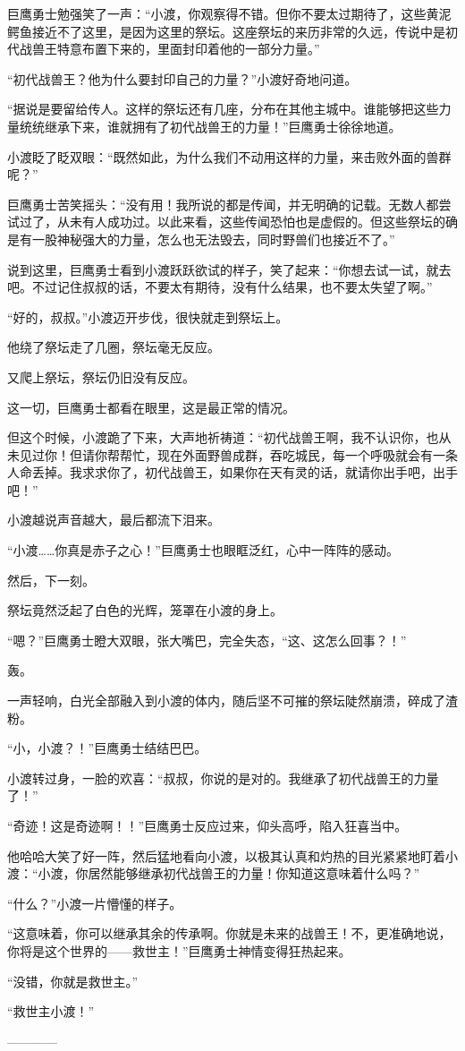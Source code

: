 \begin{this_body}
巨鹰勇士勉强笑了一声：“小渡，你观察得不错。但你不要太过期待了，这些黄泥鳄鱼接近不了这里，是因为这里的祭坛。这座祭坛的来历非常的久远，传说中是初代战兽王特意布置下来的，里面封印着他的一部分力量。”

“初代战兽王？他为什么要封印自己的力量？”小渡好奇地问道。

“据说是要留给传人。这样的祭坛还有几座，分布在其他主城中。谁能够把这些力量统统继承下来，谁就拥有了初代战兽王的力量！”巨鹰勇士徐徐地道。

小渡眨了眨双眼：“既然如此，为什么我们不动用这样的力量，来击败外面的兽群呢？”

巨鹰勇士苦笑摇头：“没有用！我所说的都是传闻，并无明确的记载。无数人都尝试过了，从未有人成功过。以此来看，这些传闻恐怕也是虚假的。但这些祭坛的确是有一股神秘强大的力量，怎么也无法毁去，同时野兽们也接近不了。”

说到这里，巨鹰勇士看到小渡跃跃欲试的样子，笑了起来：“你想去试一试，就去吧。不过记住叔叔的话，不要太有期待，没有什么结果，也不要太失望了啊。”

“好的，叔叔。”小渡迈开步伐，很快就走到祭坛上。

他绕了祭坛走了几圈，祭坛毫无反应。

又爬上祭坛，祭坛仍旧没有反应。

这一切，巨鹰勇士都看在眼里，这是最正常的情况。

但这个时候，小渡跪了下来，大声地祈祷道：“初代战兽王啊，我不认识你，也从未见过你！但请你帮帮忙，现在外面野兽成群，吞吃城民，每一个呼吸就会有一条人命丢掉。我求求你了，初代战兽王，如果你在天有灵的话，就请你出手吧，出手吧！”

小渡越说声音越大，最后都流下泪来。

“小渡……你真是赤子之心！”巨鹰勇士也眼眶泛红，心中一阵阵的感动。

然后，下一刻。

祭坛竟然泛起了白色的光辉，笼罩在小渡的身上。

“嗯？”巨鹰勇士瞪大双眼，张大嘴巴，完全失态，“这、这怎么回事？！”

轰。

一声轻响，白光全部融入到小渡的体内，随后坚不可摧的祭坛陡然崩溃，碎成了渣粉。

“小，小渡？！”巨鹰勇士结结巴巴。

小渡转过身，一脸的欢喜：“叔叔，你说的是对的。我继承了初代战兽王的力量了！”

“奇迹！这是奇迹啊！！”巨鹰勇士反应过来，仰头高呼，陷入狂喜当中。

他哈哈大笑了好一阵，然后猛地看向小渡，以极其认真和灼热的目光紧紧地盯着小渡：“小渡，你居然能够继承初代战兽王的力量！你知道这意味着什么吗？”

“什么？”小渡一片懵懂的样子。

“这意味着，你可以继承其余的传承啊。你就是未来的战兽王！不，更准确地说，你将是这个世界的——救世主！”巨鹰勇士神情变得狂热起来。

“没错，你就是救世主。”

“救世主小渡！”

------------

\end{this_body}

